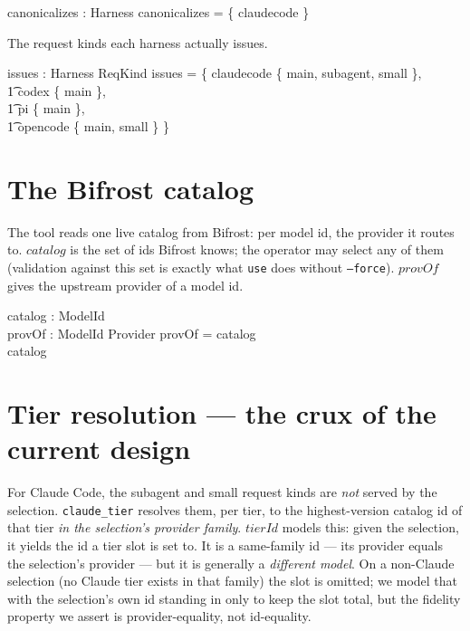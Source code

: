 \documentclass{article}
\begin{document}
\begin{axdef}
  canonicalizes : \power Harness
\where
  canonicalizes = \{ claudecode \}
\end{axdef}

The request kinds each harness actually issues.

\begin{axdef}
  issues : Harness \fun \power ReqKind
\where
  issues = \{ claudecode \mapsto \{ main, subagent, small \}, \\
  \t1         codex \mapsto \{ main \}, \\
  \t1         pi \mapsto \{ main \}, \\
  \t1         opencode \mapsto \{ main, small \} \}
\end{axdef}

\section{The Bifrost catalog}

The tool reads one live catalog from Bifrost: per model id, the provider it
routes to. $catalog$ is the set of ids Bifrost knows; the operator may select
any of them (validation against this set is exactly what \texttt{use} does
without \texttt{--force}). $provOf$ gives the upstream provider of a model id.

\begin{axdef}
  catalog : \power ModelId \\
  provOf : ModelId \pfun Provider
\where
  \dom provOf = catalog \\
  catalog \neq \emptyset
\end{axdef}

\section{Tier resolution --- the crux of the current design}

For Claude Code, the subagent and small request kinds are \emph{not} served by
the selection. \texttt{claude\_tier} resolves them, per tier, to the
highest-version catalog id of that tier \emph{in the selection's provider
family}. $tierId$ models this: given the selection, it yields the id a tier
slot is set to. It is a same-family id --- its provider equals the selection's
provider --- but it is generally a \emph{different model}. On a non-Claude
selection (no Claude tier exists in that family) the slot is omitted; we model
that with the selection's own id standing in only to keep the slot total, but
the fidelity property we assert is provider-equality, not id-equality.
\end{document}
